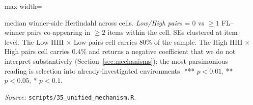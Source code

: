 \begin{table}[htbp]
\begin{adjustbox}{max width=\textwidth}
\begin{threeparttable}
\begin{tablenotes}
median winner-side Herfindahl across cells. \emph{Low/High
pairs} = $0$ vs $\geq 1$ FL--winner pairs co-appearing in
$\geq 2$ items within the cell. SEs clustered at item level.
The Low HHI $\times$ Low pairs cell carries 80\% of the
sample. The High HHI $\times$ High pairs cell carries 0.4\%
and returns a negative coefficient that we do not interpret
substantively (Section~\ref{sec:mechanisms}); the most
parsimonious reading is selection into already-investigated
environments. *** $p<0.01$, ** $p<0.05$, * $p<0.1$.
\item \textit{Source:} \texttt{scripts/35\_unified\_mechanism.R}.
\end{tablenotes}
\end{threeparttable}
\end{adjustbox}
\end{table}
